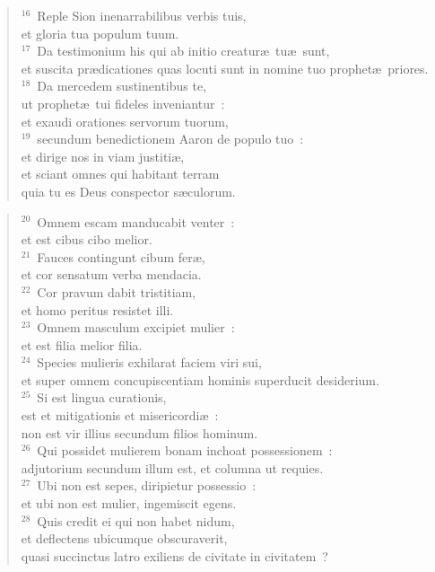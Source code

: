 \begin{verse}
${}^{16}$~Reple Sion inenarrabilibus verbis tuis,\\ et gloria tua populum tuum.\\
${}^{17}$~Da testimonium his qui ab initio creatur\ae\ tu\ae\ sunt,\\ et suscita pr\ae dicationes quas locuti sunt in nomine tuo prophet\ae\ priores.\\
${}^{18}$~Da mercedem sustinentibus te,\\ ut prophet\ae\ tui fideles inveniantur~:\\ et exaudi orationes servorum tuorum,\\
${}^{19}$~secundum benedictionem Aaron de populo tuo~:\\ et dirige nos in viam justiti\ae ,\\ et sciant omnes qui habitant terram\\ quia tu es Deus conspector s\ae culorum.\end{verse}


\begin{verse}${}^{20}$~Omnem escam manducabit venter~:\\ et est cibus cibo melior.\\
${}^{21}$~Fauces contingunt cibum fer\ae ,\\ et cor sensatum verba mendacia.\\
${}^{22}$~Cor pravum dabit tristitiam,\\ et homo peritus resistet illi.\\
${}^{23}$~Omnem masculum excipiet mulier~:\\ et est filia melior filia.\\
${}^{24}$~Species mulieris exhilarat faciem viri sui,\\ et super omnem concupiscentiam hominis superducit desiderium.\\
${}^{25}$~Si est lingua curationis,\\ est et mitigationis et misericordi\ae~:\\ non est vir illius secundum filios hominum.\\
${}^{26}$~Qui possidet mulierem bonam inchoat possessionem~:\\ adjutorium secundum illum est, et columna ut requies.\\
${}^{27}$~Ubi non est sepes, diripietur possessio~:\\ et ubi non est mulier, ingemiscit egens.\\
${}^{28}$~Quis credit ei qui non habet nidum,\\ et deflectens ubicumque obscuraverit,\\ quasi succinctus latro exiliens de civitate in civitatem~?\end{verse}


